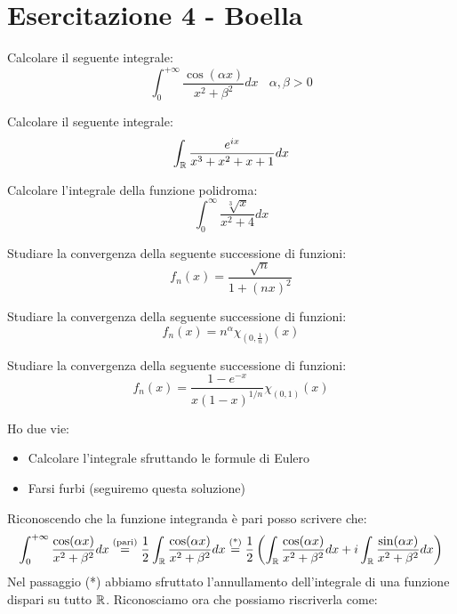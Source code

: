 \chapter{Esercitazione 4 - Boella}
\ParteEsercizi
\Esercizio{}

Calcolare il seguente integrale:
\begin{equation*}
\int ^{+\infty }_{0}\frac{\cos (\alpha x)}{x^{2} +\beta ^{2}} dx\ \ \ \ \alpha ,\beta  >0
\end{equation*}
\Esercizio{}

Calcolare il seguente integrale:
\begin{equation*}
\int _{\mathbb{R} }\frac{e^{ix}}{x^{3} +x^{2} +x+1} dx
\end{equation*}
\Esercizio{}

Calcolare l'integrale della funzione polidroma:
\begin{equation*}
\int ^{\infty }_{0}\frac{\sqrt[3]{x}}{x^{2} +4} dx
\end{equation*}
\Esercizio{}

Studiare la convergenza della seguente successione di funzioni:
\begin{equation*}
f_{n} (x)=\frac{\sqrt{n}}{1+(nx)^{2}}
\end{equation*}
\Esercizio{}

Studiare la convergenza della seguente successione di funzioni:
\begin{equation*}
f_{n} (x)=n^{\alpha } \chi _{\left( 0,\frac{1}{n}\right)} (x)
\end{equation*}
\Esercizio{}

Studiare la convergenza della seguente successione di funzioni:
\begin{equation*}
f_{n} (x)=\frac{1-e^{-x}}{x( 1-x)^{1/n}} \chi _{( 0,1)} (x)
\end{equation*}
\ParteSoluzioni
\Soluzione

Ho due vie:
\begin{itemize}
\item Calcolare l'integrale sfruttando le formule di Eulero
\item Farsi furbi (seguiremo questa soluzione)
\end{itemize}

Riconoscendo che la funzione integranda è pari posso scrivere che:
\begin{equation*}
\int ^{+\infty }_{0}\frac{\cos (\alpha x)}{x^{2} +\beta ^{2}} dx\overset{\text{(pari)}}{=}\frac{1}{2}\int _{\mathbb{R} }\frac{\cos (\alpha x)}{x^{2} +\beta ^{2}} dx\overset{\text{(*)}}{=}\frac{1}{2}\left(\int _{\mathbb{R} }\frac{\cos (\alpha x)}{x^{2} +\beta ^{2}} dx+i\int _{\mathbb{R} }\frac{\sin (\alpha x)}{x^{2} +\beta ^{2}} dx\right)
\end{equation*}
Nel passaggio (*) abbiamo sfruttato l'annullamento dell'integrale di una funzione dispari su tutto $\mathbb{R} $. Riconosciamo ora che possiamo riscriverla come:


